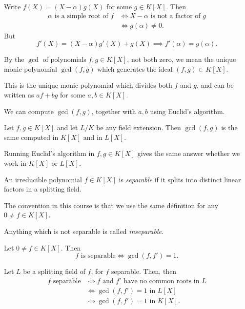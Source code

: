 \documentclass[12pt]{article}
\begin{document}
\begin{proofbox}
	Write $f(X) = (X-\alpha)g(X)$ for some $g \in K[X]$. Then
	\begin{align*}
		\alpha \text{ is a simple root of } f &\iff X - \alpha \text{ is not a factor of } g \\
						      &\iff g(\alpha) \neq 0.
	\end{align*}
	But 
	\[
	f'(X) = (X-\alpha)g'(X) + g(X) \implies f'(\alpha) = g(\alpha).
	\]
\end{proofbox}

By the $\gcd$ of polynomials $f, g \in K[X]$, not both zero, we mean the unique monic polynomial $\gcd(f, g)$ which generates the ideal $(f, g) \subset K[X]$.

This is the unique monic polynomial which divides both $f$ and $g$, and can be written as $af + bg$ for some $a, b \in K[X]$.

We can compute $\gcd(f, g)$, together with $a, b$ using Euclid's algorithm.

\begin{lemma}
	Let $f, g \in K[X]$ and let $L/K$ be any field extension. Then $\gcd(f, g)$ is the same computed in $K[X]$ and in $L[X]$.
\end{lemma}

\begin{proofbox}
	Running Euclid's algorithm in $f, g \in K[X]$ gives the same answer whether we work in $K[X]$ or $L[X]$.
\end{proofbox}

\begin{definition}
	An irreducible polynomial $f \in K[X]$ is \emph{separable} if it splits into distinct linear factors in a splitting field.

	The convention in this course is that we use the same definition for any $0 \neq f \in K[X]$.

	Anything which is not separable is called \emph{inseparable}.
\end{definition}

\begin{lemma}
	Let $0 \neq f \in K[X]$. Then
	\[
		f \text{ is separable} \iff \gcd(f, f') = 1.
	\]
\end{lemma}

\begin{proofbox}
	Let $L$ be a splitting field of $f$, for $f$ separable. Then, then
	\begin{align*}
		f \text{ separable} &\iff f \text{ and } f' \text{ have no common roots in } L \\
				    &\iff \gcd(f, f') = 1 \text{ in } L[X] \\
				    &\iff \gcd(f, f') = 1 \text{ in } K[X].
	\end{align*}
\end{proofbox}
\end{document}
